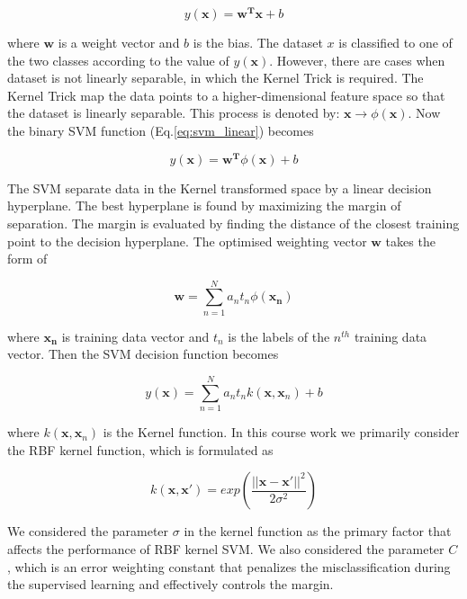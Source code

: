 \documentclass[10pt,twocolumn,letterpaper]{article}
\begin{document}
\begin{equation}
y(\boldsymbol{x}) = \boldsymbol{w^T x} + b
\label{eq:svm_linear}
\end{equation}

where $\boldsymbol{w}$ is a weight vector and $b$ is the bias. The dataset $x$ is classified to one of the two classes according to the value of $y(\boldsymbol{x})$. However, there are cases when dataset is not linearly separable, in which the Kernel Trick is required. The Kernel Trick map the data points to a higher-dimensional feature space so that the dataset is linearly separable. This process is denoted by: $\boldsymbol{x} \rightarrow \phi (\boldsymbol{x})$. Now the binary SVM function (Eq.\ref{eq:svm_linear}) becomes

\begin{equation}
y(\boldsymbol{x}) = \boldsymbol{w^T} \phi (\boldsymbol{x}) + b
\end{equation}

The SVM separate data in the Kernel transformed space by a linear decision hyperplane. The best hyperplane is found by maximizing the margin of separation. The margin is evaluated by finding the distance of the closest training point to the decision hyperplane. The optimised weighting vector $\boldsymbol{w}$ takes the form of

\begin{equation}
\boldsymbol{w} = \sum_{n=1}^{N} a_n t_n \phi(\boldsymbol{x_n})
\end{equation}

where $\boldsymbol{x_n}$ is training data vector and $t_n$ is the labels of the $n^{th}$ training data vector. Then the SVM decision function becomes

\begin{equation}
	y(\boldsymbol{x}) = \sum_{n=1}^{N} a_n t_n k(\boldsymbol{x}, \boldsymbol{x}_n)  + b
\end{equation}

where $k(\boldsymbol{x}, \boldsymbol{x}_n) $ is the Kernel function. In this course work we primarily consider the RBF kernel function, which is formulated as

\begin{equation}
 k(\boldsymbol{x}, \boldsymbol{x'}) = exp(\frac{||\boldsymbol{x} - \boldsymbol{x'}||^2}{2 \sigma^2})
\end{equation}

We considered the parameter $\sigma$ in the kernel function as the primary factor that affects the performance of RBF kernel SVM. We also considered the parameter $C$, which is an error weighting constant that penalizes the misclassification during the supervised learning and effectively controls the margin.
\end{document}
